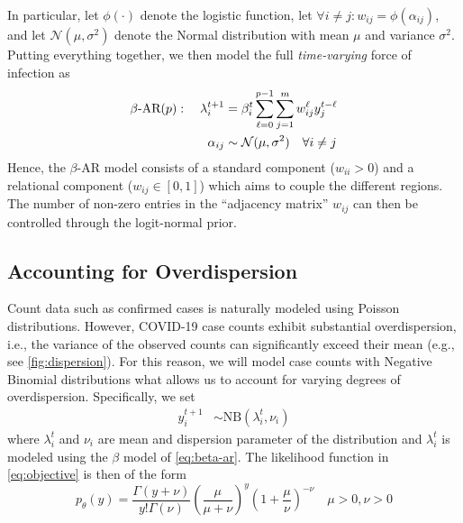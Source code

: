 \documentclass[nobib]{tufte-handout}
\newcommand{\AR}{\text{AR}}
\newcommand{\bAR}{\ensuremath{\beta}\text{-AR}\xspace}
\newcommand{\foi}{\lambda}
\begin{document}
In particular, let \(\phi(\cdot)\) denote the logistic function, let \({\forall i
\neq j : w_{ij} = \phi(\alpha_{ij})}\), and let \(\mathcal{N}(\mu, \sigma^2)\)
denote the Normal distribution with mean \(\mu\) and variance \(\sigma^2\). Putting
everything together, we then model the full \emph{time-varying} force of infection as
\begin{align}
\bAR(p): \quad \foi^{t+1}_i & =
\beta_i^t \sum_{\ell=0}^{p-1}\sum_{j=1}^m w_{ij}^\ell y_j^{t - \ell} \label{eq:beta-ar} \\
    \alpha_{ij} & \sim \mathcal{N}(\mu, \sigma^2) \quad \forall i \neq j \notag
\end{align}
Hence, the \(\bAR\) model consists of a standard \AR\xspace component (\(w_{ii} > 0\)) and
a relational component (\(w_{ij} \in [0, 1]\)) which aims to couple the different
regions. The number of non-zero entries in the ``adjacency matrix'' \(w_{ij}\) can
then be controlled through the logit-normal prior.

\subsection{Accounting for Overdispersion}
\label{sec:org8286d6d}
Count data such as confirmed cases is naturally modeled using Poisson
distributions. However, COVID-19 case counts exhibit substantial overdispersion,
i.e., the variance of the observed counts can significantly exceed their mean
(e.g., see \cref{fig:dispersion}). For this
reason, we will model case counts with Negative Binomial distributions what
allows us to account for varying degrees of overdispersion. Specifically, we set
\begin{align*}
    y^{t+1}_{i} & \sim \text{NB}(\foi_i^{t}, \nu_i)
\end{align*}
where \(\foi^t_i\) and \(\nu_i\) are mean and dispersion parameter of the
distribution and \(\foi^t_i\) is modeled using the \bAR model of \cref{eq:beta-ar}. The
likelihood function in \cref{eq:objective} is then of the form
\begin{equation*}
p_\theta(y) = \frac{\Gamma(y + \nu)}{y!\Gamma(\nu)}\left(\frac{\mu}{\mu +\nu}\right)^{y}\left(1 + \frac{\mu}{\nu}\right)^{-\nu}
\quad \mu > 0, \nu > 0
\end{equation*}
\end{document}
